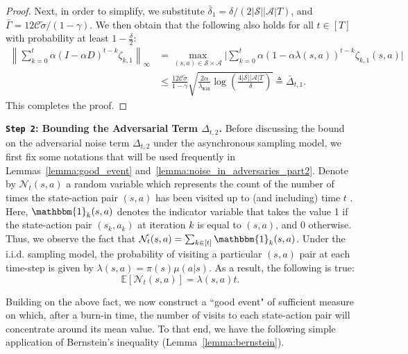 \documentclass{article}
\newcommand{\mc}{\mathcal}
\begin{document}
\begin{proof}
 Next, in order to simplify, we substitute \(\bar{\delta}_1 = \delta/(2|\mc{S}||\mc{A}|T) \), and \(\bar{\Gamma} = 12 \mc{C} \tilde{\sigma}/(1-\gamma)\). We then obtain that the following also holds for all $t \in [T]$ with probability at least \(1-\frac{\delta}{2}\):
\begin{equation}\label{eqn:delta_1}
\begin{aligned}
     \left \lVert \sum_{k=0}^{t} \alpha (I-\alpha D)^{t-k} \mathcal{\zeta}_{k,1}\right \rVert_\infty &= \max_{(s,a) \in \mathcal{S}\times\mathcal{A}}\bigg\lvert \sum_{k=0}^{t} \alpha (1-\alpha \lambda(s,a))^{t-k} \zeta_{k,1}(s,a) \bigg\rvert\\ &\le \frac{12 \mc{C} \tilde{\sigma}}{1-\gamma} \sqrt{\frac{2\alpha}{\lambda_{\texttt{min}}} \log \left( \frac{4|\mathcal{S}||\mathcal{A}|T}{\delta} \right)} \triangleq \bar{\Delta}_{t,1}.
\end{aligned}
\end{equation}
This completes the proof. 
\end{proof}
\textbf{\texttt{Step 2}: Bounding the Adversarial Term \(\Delta_{t,2}\).} Before discussing the bound on the adversarial noise term \(\Delta_{t,2}\) under the asynchronous sampling model, we first fix some notations that will be used frequently in Lemmas~\ref{lemma:good_event} and~\ref{lemma:noise_in_adversaries_part2}. Denote by \( \mathcal{N}_t(s,a) \) a random variable which represents the count of the number of times the state-action pair \( (s,a) \) has been visited up to (and including) time \( t \) . Here, \(\mathbbm{1}_k(s,a)\) denotes the indicator variable that takes the value 1 if the state-action pair \((s_k, a_k)\) at iteration \(k\) is equal to \((s, a)\), and 0 otherwise.
Thus, we observe the fact that $\mathcal{N}_t(s,a) = \sum_{k \in [t]} \mathbbm{1}_k(s,a)$. Under the i.i.d. sampling model, the probability of visiting a particular $(s,a)$ pair at each time-step is given by $\lambda(s,a)=\pi(s) \mu(a|s).$ As a result, the following is true:
\begin{equation}
    \mathbb{E}\left[\mathcal{N}_t(s,a)\right] = \lambda(s,a)t.
\end{equation}

Building on the above fact, we now construct a ``good event" of sufficient measure on which, after a burn-in time, the number of visits to each state-action pair will concentrate around its mean value. To that end, we have the following simple application of Bernstein's inequality (Lemma~\ref{lemma:bernstein}). 
\end{document}
